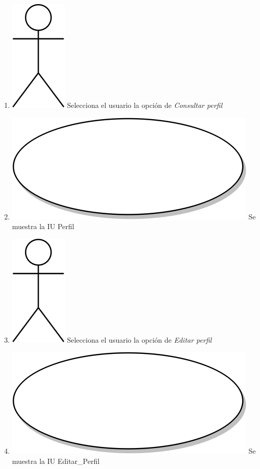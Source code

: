 \begin{enumerate}
\item {\includegraphics[scale=.1]{Capitulo3/img/actor.png} Selecciona el usuario la opción de \textit{Consultar perfil}}
\item {\includegraphics[scale=.05]{Capitulo3/img/proceso.png} Se muestra la IU Perfil}
\item {\includegraphics[scale=.1]{Capitulo3/img/actor.png} Selecciona el usuario la opción de \textit{Editar perfil}}
\item {\includegraphics[scale=.05]{Capitulo3/img/proceso.png} Se muestra la IU Editar_Perfil}

\end{enumerate}
